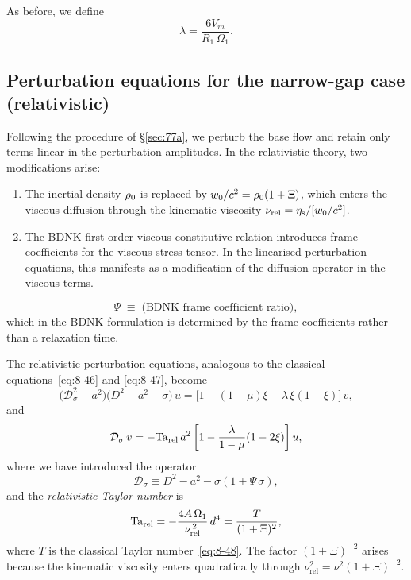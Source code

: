 As before, we define
\begin{equation}
\label{eq:rel-8-40}
\lambda = \frac{6V_m}{R_1\,\Omega_1}.
\end{equation}

\subsection{Perturbation equations for the narrow-gap case (relativistic)}
\label{sec:rel-77a}

Following the procedure of \S\ref{sec:77a}, we perturb the base flow
and retain only terms linear in the perturbation amplitudes.  In the
relativistic theory, two modifications arise:
\begin{enumerate}
\item[(i)] The inertial density $\rho_0$ is replaced by
  $w_0/c^2 = \rho_0(1+\Xi)$, which enters the viscous
  diffusion through the kinematic viscosity
  $\nu_{\mathrm{rel}} = \eta_{\mathrm{s}} / [w_0/c^2]$.
\item[(ii)] The BDNK first-order viscous constitutive relation introduces
  frame coefficients for the viscous stress tensor.
  In the linearised perturbation equations, this manifests as a
  modification of the diffusion operator in the viscous terms.
\end{enumerate}

\begin{equation}
\Psi \;\equiv\; \text{(BDNK frame coefficient ratio)},
\end{equation}
which in the BDNK formulation is determined by the frame coefficients
rather than a relaxation time.

The relativistic perturbation equations, analogous to the classical
equations~\eqref{eq:8-46} and \eqref{eq:8-47}, become
\begin{equation}
\label{eq:rel-8-46}
\bigl(\mathcal{D}_\sigma^2 - a^2\bigr)
\bigl(D^2 - a^2 - \sigma\bigr)\,u
= \bigl[1 - (1-\mu)\xi + \lambda\,\xi(1-\xi)\bigr]\,v,
\end{equation}
and
\begin{equation}
\label{eq:rel-8-47}
\mathcal{D}_\sigma\,v
= -\mathrm{Ta}_{\mathrm{rel}}\,a^2\,\biggl[1 - \frac{\lambda}{1-\mu}(1-2\xi)\biggr]\,u,
\end{equation}
where we have introduced the operator
\begin{equation}
\label{eq:rel-8-Dop}
\mathcal{D}_\sigma \equiv D^2 - a^2 - \sigma(1 + \Psi\,\sigma),
\end{equation}
and the \emph{relativistic Taylor number} is
\begin{equation}
\label{eq:rel-8-48}
\mathrm{Ta}_{\mathrm{rel}} = -\frac{4A\,\Omega_1}{\nu_{\mathrm{rel}}^{\,2}}\,d^4
  = \frac{T}{(1+\Xi)^2},
\end{equation}
where $T$ is the classical Taylor number~\eqref{eq:8-48}.  The factor
$(1+\Xi)^{-2}$ arises because the kinematic viscosity enters
quadratically through $\nu_{\mathrm{rel}}^2 = \nu^2(1+\Xi)^{-2}$.

